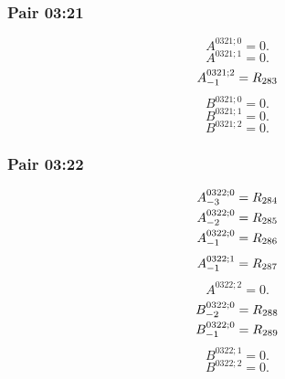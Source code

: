\documentclass[11pt,a4paper]{article}
\begin{document}
\subsubsection{Pair 03:21}
\begin{equation}
A^{0321;0}=0.
\label{eq:cat-map-258}
\end{equation}
\begin{equation}
A^{0321;1}=0.
\label{eq:cat-map-259}
\end{equation}
\begin{equation}
\shortstack[l]{$\displaystyle A^{0321;2}_{-1}=R_{283}$}
\label{eq:cat-map-260}
\end{equation}
\begin{equation}
B^{0321;0}=0.
\label{eq:cat-map-261}
\end{equation}
\begin{equation}
B^{0321;1}=0.
\label{eq:cat-map-262}
\end{equation}
\begin{equation}
B^{0321;2}=0.
\label{eq:cat-map-263}
\end{equation}
\subsubsection{Pair 03:22}
\begin{equation}
\shortstack[l]{$\displaystyle A^{0322;0}_{-3}=R_{284}$\\
$\displaystyle A^{0322;0}_{-2}=R_{285}$\\
$\displaystyle A^{0322;0}_{-1}=R_{286}$}
\label{eq:cat-map-264}
\end{equation}
\begin{equation}
\shortstack[l]{$\displaystyle A^{0322;1}_{-1}=R_{287}$}
\label{eq:cat-map-265}
\end{equation}
\begin{equation}
A^{0322;2}=0.
\label{eq:cat-map-266}
\end{equation}
\begin{equation}
\shortstack[l]{$\displaystyle B^{0322;0}_{-2}=R_{288}$\\
$\displaystyle B^{0322;0}_{-1}=R_{289}$}
\label{eq:cat-map-267}
\end{equation}
\begin{equation}
B^{0322;1}=0.
\label{eq:cat-map-268}
\end{equation}
\begin{equation}
B^{0322;2}=0.
\label{eq:cat-map-269}
\end{equation}
\end{document}
